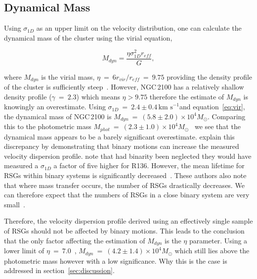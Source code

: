 \documentclass[useAMS,usenatbib]{mn2e}
\def\kms{$\mbox{km s}^{-1}$}
\begin{document}
\subsection{Dynamical Mass} %
\label{sub:dynamical_mass}


Using $\sigma_{1D}$ as an upper limit on the velocity distribution, one can calculate the dynamical mass of the cluster using the virial equation,

\begin{equation}
  M_{dyn} = \frac{\eta\sigma_{1D}^{2}r_{eff}}{G},
  \label{eq:vir}
\end{equation}

\noindent where $M_{dyn}$ is the virial mass, $\eta~=~6r_{vir}/r_{eff}~=~9.75$ providing the density profile of the cluster is sufficiently steep~\citep{2010ARA&A..48..431P}.
However, NGC\,2100 has a relatively shallow density profile ($\gamma~=~2.3$) which means $\eta>9.75$ therefore the estimate of $M_{dyn}$ is knowingly an overestimate.
Using $\sigma_{1D}~=~2.4\pm0.4$\,\kms and equation~\ref{eq:vir}, the dynamical mass of NGC\,2100 is $M_{dyn}~=~(5.8\pm2.0)\times 10^{4}M_{\odot}$.
Comparing this to the photometric mass $M_{phot}~=~(2.3\pm1.0)\times 10^{4}M_{\odot}$~\citep{2005ApJS..161..304M} we see that the dynamical mass appears to be a barely significant overestimate.
\citet{2010MNRAS.402.1750G} explain this discrepancy by demonstrating that binary motions can increase the measured velocity dispersion profile.
\citet{2012A&A...546A..73H} note that had binarity been neglected they would have measured a $\sigma_{1D}$ a factor of five higher for R136.
However, the mean lifetime for RSGs within binary systems is significantly decreased~\citep{2008MNRAS.384.1109E}.
These authors also note that where mass transfer occurs, the number of RSGs drastically decreases.
We can therefore expect that the numbers of RSGs in a close binary system are very small~\cite{2009ApJ...696.2014D}.

Therefore, the velocity dispersion profile derived using an effectively single sample of RSGs should not be affected by binary motions.
This leads to the conclusion that the only factor affecting the estimation of $M_{dyn}$ is the $\eta$ parameter.
Using a lower limit of $\eta~=~7.0$~\citep[estimated from Fig. 4a from ][]{2010ARA&A..48..431P}, $M_{dyn}~=~(4.2\pm1.4)\times 10^{4}M_{\odot}$ which still lies above the photometric mass however with a low significance.
Why this is the case is addressed in section~\ref{sec:discussion}.
\end{document}
